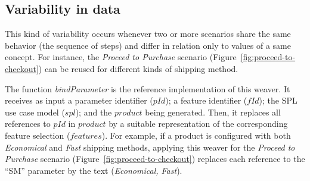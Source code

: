\documentclass{sig-alternate}
\begin{document}

\subsection{Variability in data}\label{sub:bind-weaver}

This kind of variability occurs whenever two or more scenarios share the same
behavior (the sequence of steps) and differ in relation only to values of a same
concept. For instance, the \emph{Proceed to Purchase} scenario
(Figure~\ref{fig:proceed-to-checkout}) can be reused for different kinds
of shipping method. 





The function \emph{bindParameter} is the reference implementation of 
this weaver. It receives as input 
a parameter identifier ($pId$); a feature identifier ($fId$); the SPL use case model ($spl$); and the
$product$ being generated. Then, it replaces all references to $pId$ in
$product$ by a suitable representation of the corresponding feature selection ($features$). For example, if a product is configured with both \emph{Economical} and \emph{Fast}
shipping methods, applying this weaver for the \emph{Proceed to
Purchase} scenario (Figure~\ref{fig:proceed-to-checkout}) replaces each reference to the ``SM'' parameter by
the text (\emph{Economical, Fast}).
\end{document}
